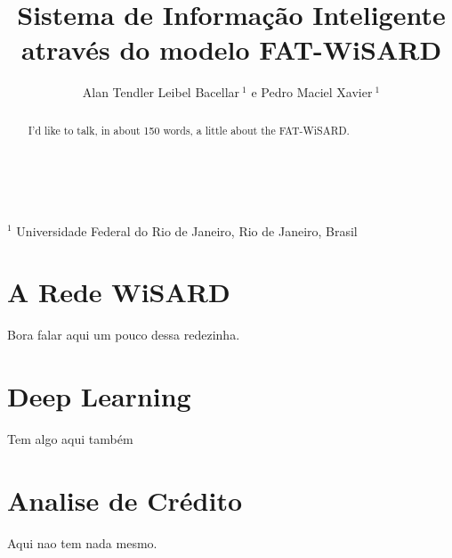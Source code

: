 \documentclass{article}
\begin{document}
%
%
\title{\bf Sistema de Informação Inteligente através do modelo FAT-WiSARD}
\maketitle
%

\large \centering \author{
Alan Tendler Leibel Bacellar$\ ^{1}$ 
e Pedro Maciel Xavier$\ ^{1}$}
\\ \  \\ 
\normalsize \centering 
$^{1}$ Universidade Federal do Rio de Janeiro, Rio de Janeiro, Brasil
\\
%
\begin{abstract}
I'd like to talk, in about 150 words, a little about the FAT-WiSARD.
\end{abstract}
%
\section{A Rede WiSARD}

Bora falar aqui um pouco dessa redezinha.

\section{Deep Learning}

Tem algo aqui também

\section{Analise de Crédito}

Aqui nao tem nada mesmo.
%
\end{document}

